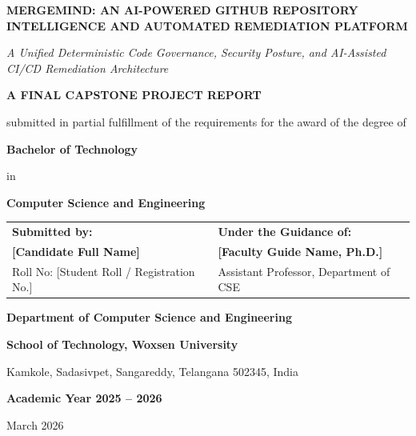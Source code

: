 \documentclass[12pt,a4paper,oneside]{report}
\begin{document}




\begin{titlepage}
    \centering
    \vspace*{1cm}
    
    {\Huge \bfseries MERGEMIND: AN AI-POWERED GITHUB REPOSITORY INTELLIGENCE AND AUTOMATED REMEDIATION PLATFORM \par}
    
    \vspace{0.6cm}
    {\large \itshape A Unified Deterministic Code Governance, Security Posture, and AI-Assisted CI/CD Remediation Architecture \par}
    
    \vspace{1.5cm}
    {\large \bfseries A FINAL CAPSTONE PROJECT REPORT \par}
    \vspace{0.3cm}
    {\normalsize submitted in partial fulfillment of the requirements for the award of the degree of \par}
    \vspace{0.4cm}
    {\large \bfseries Bachelor of Technology \par}
    \vspace{0.2cm}
    {\normalsize in \par}
    \vspace{0.2cm}
    {\large \bfseries Computer Science and Engineering \par}
    
    \vspace{1.8cm}
    \begin{table}[h]
        \centering
        \begin{tabular}{p{} p{}}
            \textbf{Submitted by:} & \textbf{Under the Guidance of:} \\
            \textbf{[Candidate Full Name]} & \textbf{[Faculty Guide Name, Ph.D.]} \\
            Roll No: [Student Roll / Registration No.] & Assistant Professor, Department of CSE \\
        \end{tabular}
    \end{table}
    
    \vfill
    
    {\bfseries Department of Computer Science and Engineering \par}
    {\bfseries School of Technology, Woxsen University \par}
    {\normalsize Kamkole, Sadasivpet, Sangareddy, Telangana 502345, India \par}
    \vspace{0.4cm}
    {\large \bfseries Academic Year 2025 -- 2026 \par}
    {\normalsize March 2026 \par}
\end{titlepage}
\end{document}

